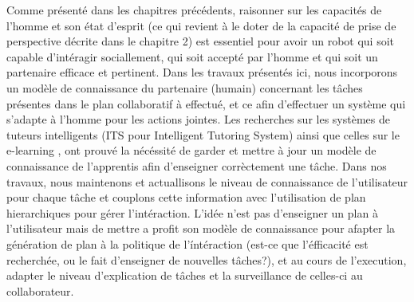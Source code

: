 \documentclass[a4paper,11pt,twoside]{StyleThese}
\begin{document}
Comme présenté dans les chapitres précédents, raisonner sur les capacités de l'homme et son état d'esprit (ce qui revient à le doter de la capacité de prise de perspective décrite dans le chapitre 2) est essentiel pour avoir un robot qui soit capable d'intéragir sociallement, qui soit accepté par l'homme et qui soit un partenaire efficace et pertinent.
Dans les travaux présentés ici, nous incorporons un modèle de connaissance du partenaire (humain) concernant les tâches présentes dans le plan collaboratif à effectué, et ce afin d'effectuer un système qui s'adapte à l'homme pour les actions jointes.
Les recherches sur les systèmes de tuteurs intelligents (ITS pour Intelligent Tutoring System) \cite{brusilovskiy1994construction} ainsi que celles sur le e-learning \cite{brusilovskiy2005}, ont prouvé la nécéssité de garder et mettre à jour un modèle de connaissance de l'apprentis afin d'enseigner corrèctement une tâche.
%
Dans nos travaux, nous maintenons et actuallisons le niveau de connaissance de l'utilisateur pour chaque tâche et couplons cette information avec l'utilisation de plan hierarchiques pour gérer l'intéraction. L'idée n'est pas d'enseigner un plan à l'utilisateur mais de mettre a profit son modèle de connaissance pour afapter la génération de plan à la politique de l'íntéraction (est-ce que l'éfficacité est recherchée, ou le fait d'enseigner de nouvelles tâches?), et au cours de l'execution, adapter le niveau d'explication de tâches et la surveillance de celles-ci au collaborateur.
%
\end{document}
